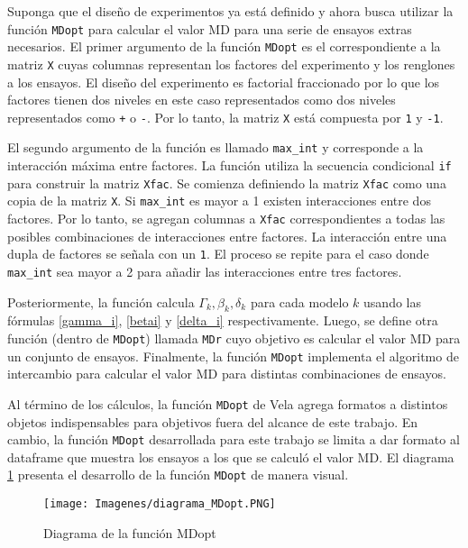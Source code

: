 Suponga que el diseño de experimentos ya está definido y ahora busca utilizar la función \texttt{MDopt} para calcular el valor MD para una serie de ensayos extras necesarios. El primer argumento de la función \texttt{MDopt} es el correspondiente a la matriz \texttt{X} cuyas columnas representan los factores del experimento y los renglones a los ensayos. El diseño del experimento es factorial fraccionado por lo que los factores tienen dos niveles en este caso representados como dos niveles representados como \texttt{+} o \texttt{-}. Por lo tanto, la matriz \texttt{X} está compuesta por \texttt{1} y  \texttt{-1}. 

El segundo argumento de la función es llamado \texttt{max\_int} y corresponde a la interacción máxima entre factores. La función utiliza la secuencia condicional \texttt{if} para construir la matriz \texttt{Xfac}. Se comienza definiendo la matriz \texttt{Xfac} como una copia de la matriz \texttt{X}. Si \texttt{max\_int} es mayor a 1 existen interacciones entre dos factores. Por lo tanto, se agregan columnas a \texttt{Xfac} correspondientes a todas las posibles combinaciones de interacciones entre factores. La interacción entre una dupla de factores se señala con un \texttt{1}. El proceso se repite para el caso donde \texttt{max\_int} sea mayor a 2 para añadir las interacciones entre tres factores. 

Posteriormente, la función calcula $\Gamma_k, \beta_k, \delta_k$ para cada modelo $k$ usando las fórmulas \ref{gamma_i}, \ref{betai} y \ref{delta_i} respectivamente. Luego, se define otra función (dentro de \texttt{MDopt}) llamada \texttt{MDr} cuyo objetivo es calcular el valor MD para un conjunto de ensayos. Finalmente, la función \texttt{MDopt} implementa el algoritmo de intercambio para calcular el valor MD para distintas combinaciones de ensayos.

Al término de los cálculos, la función \texttt{MDopt} de Vela agrega formatos a distintos objetos indispensables para objetivos fuera del alcance de este trabajo. En cambio, la función \texttt{MDopt} desarrollada para este trabajo se limita a dar formato al dataframe que muestra los ensayos a los que se calculó el valor MD. El diagrama \ref{diagrama_mdopt} presenta el desarrollo de la función \texttt{MDopt} de manera visual. 

\begin{figure}[h]
	\begin{center} 
		\texttt{[image: Imagenes/diagrama\_MDopt.PNG]}
		\caption{Diagrama de la función MDopt}
		\label{diagrama_mdopt}
	\end{center}
\end{figure} 

